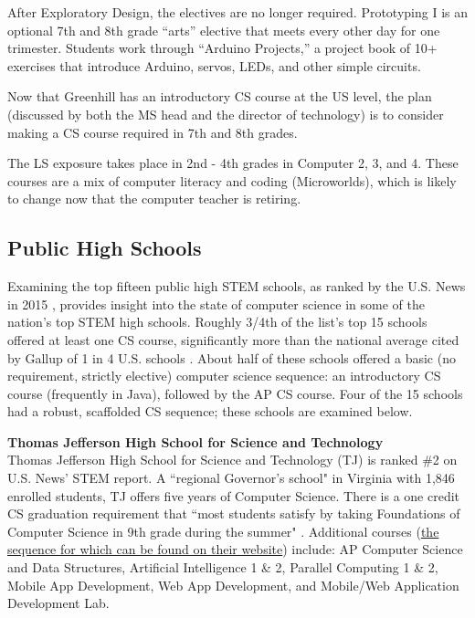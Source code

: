 After Exploratory Design, the electives are no longer required. Prototyping I is an optional 7th and 8th grade “arts” elective that meets every other day for one trimester. Students work through “Arduino Projects,” a project book of 10+ exercises that introduce Arduino, servos, LEDs, and other simple circuits. \par
Now that Greenhill has an introductory CS course at the US level, the plan (discussed by both the MS head and the director of technology) is to consider making a CS course required in 7th and 8th grades. \par
The LS exposure takes place in 2nd - 4th grades in Computer 2, 3, and 4. These courses are a mix of computer literacy and coding (Microworlds), which is likely to change now that the computer teacher is retiring.

\subsection{Public High Schools}
Examining the top fifteen public high STEM schools, as ranked by the U.S. News in 2015 \cite{usnews}, provides insight into the state of computer science in some of the nation's top STEM high schools. Roughly 3/4th of the list's top 15 schools offered at least one CS course, significantly more than the national average cited by Gallup of 1 in 4 U.S. schools \cite{gallup}. About half of these schools offered a basic (no requirement, strictly elective) computer science sequence: an introductory CS course (frequently in Java), followed by the AP CS course. Four of the 15 schools had a robust, scaffolded CS sequence; these schools are examined below. \par
\textbf{Thomas Jefferson High School for Science and Technology} \\
Thomas Jefferson High School for Science and Technology (TJ) is ranked \#2 on U.S. News' STEM report. A ``regional Governor's school" in Virginia with 1,846 enrolled students, TJ offers five years of Computer Science. There is a one credit CS graduation requirement that ``most students satisfy by taking Foundations of Computer Science in 9th grade during the summer" \cite{tjreq}. Additional courses (\href{https://www.tjhsst.edu/research-academics/math-cs/computer-science/docs/FlowCS1516.pdf}{the sequence for which can be found on their website}) include: AP Computer Science and Data Structures, Artificial Intelligence 1 \& 2, Parallel Computing 1 \& 2, Mobile App Development, Web App Development, and Mobile/Web Application Development Lab.\par
